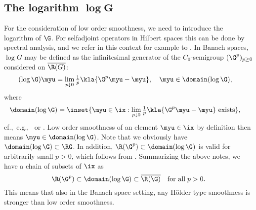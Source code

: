 \documentclass[10pt]{article}
\theoremstyle{definition}
\begin{document}
\subsection{The logarithm $ \mathbf{\log G } $}
For the consideration of low order smoothness, we need to introduce the logarithm of
$ \G $. For selfadjoint operators in Hilbert spaces this can be done by spectral analysis, and we refer in this context for example to \cite{Hohage00}.
In Banach spaces, $ \log G $ may be defined as the infinitesimal generator of the $ C_0 $-semigroup $ (\G^p)_{p \ge 0} $ considered on $ \overline{\R(G)} $:
%
\begin{align*}
(\log \G) \myu & = \lim_{p \downarrow 0} \tfrac{1}{p}\kla{\G^p \myu-\myu},
\quad \myu  \in \domain(\log \G),
\end{align*}
%
where
%
\begin{align*}
\domain(\log\G) & =
\inset{ \myu \in \ix : \lim_{p \downarrow 0} \tfrac{1}{p}\kla{\G^p \myu- \myu}
\ \textup{exists} },
\end{align*}
%
cf.,~e.g.,~\cite{Nollau69} or \cite[Proposition 3.5.3]{Haase06}.
%
Low order smoothness of an element $ \myu \in \ix $ by definition then means
$ \myu \in \domain(\log \G) $. Note that
we obviously have $ \domain(\log \G) \subset \RG $. In addition, $ \R(\G^p) \subset \domain(\log \G)$ is valid for arbitrarily small $p>0$,
which follows from \cite[Satz 1]{Nollau69}. Summarizing the above notes, we have a chain of subsets of $\ix$ as
%
\begin{equation} \label{eq:chain2}
\R(\G^p) \subset \domain(\log \G)  \subset \overline{\R(\G)} \quad \mbox{for all} \;p>0.
\end{equation}
This means that also in the Banach space setting, any H\"older-type smoothness is stronger than low order smoothness.
%
\end{document}
